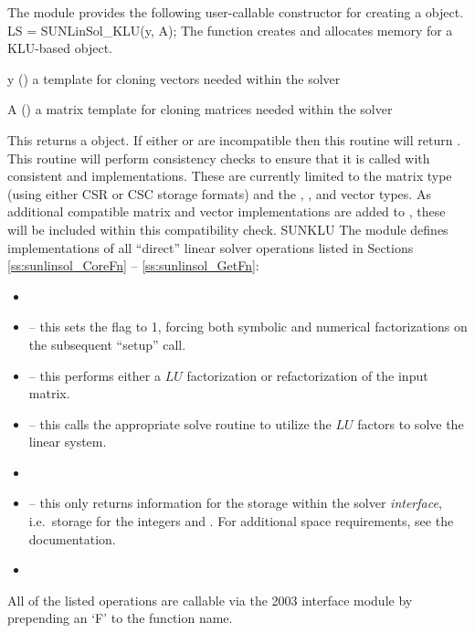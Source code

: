 The {\sunlinsolklu} module provides the following user-callable constructor
for creating a \newline {} object.
%
%
{
  LS = SUNLinSol\_KLU(y, A);
}
{
  The function  creates and allocates memory for
  a KLU-based \newline {} object.
}
{
  \begin{args}[y]
  \item[y] ()
    a template for cloning vectors needed within the solver
  \item[A] ()
    a {\sunmatsparse} matrix template for cloning matrices needed
    within the solver 
  \end{args}
}
{
  This returns a  object.  If either  or
   are incompatible then this routine will return .
}
{
  This routine will perform consistency checks to ensure that it is
  called with consistent {\nvector} and {\sunmatrix} implementations.
  These are currently limited to the {\sunmatsparse} matrix type
  (using either CSR or CSC storage formats) and the {\nvecs},
  {\nvecopenmp}, and {\nvecpthreads} vector types.  As additional
  compatible matrix and vector implementations are added to
  {\sundials}, these will be included within this compatibility
  check. 
}
{SUNKLU}
%
%
The {\sunlinsolklu} module defines implementations of all
``direct'' linear solver operations listed in Sections
\ref{ss:sunlinsol_CoreFn} -- \ref{ss:sunlinsol_GetFn}:
\begin{itemize}
\item {}
\item {} -- this sets the
   flag to 1, forcing both symbolic and numerical
  factorizations on the subsequent ``setup'' call.
\item {} -- this performs either a $LU$
  factorization or refactorization of the input matrix.
\item {} -- this calls the appropriate {\klu}
  solve routine to utilize the $LU$ factors to solve the linear
  system. 
\item {}
\item {} -- this only returns information for
  the storage within the solver \emph{interface}, i.e.~storage for the
  integers  and .  For additional
  space requirements, see the {\klu} documentation.
\item {}
\end{itemize}
All of the listed operations are callable via the {\F} 2003 interface module
by prepending an `F' to the function name.

